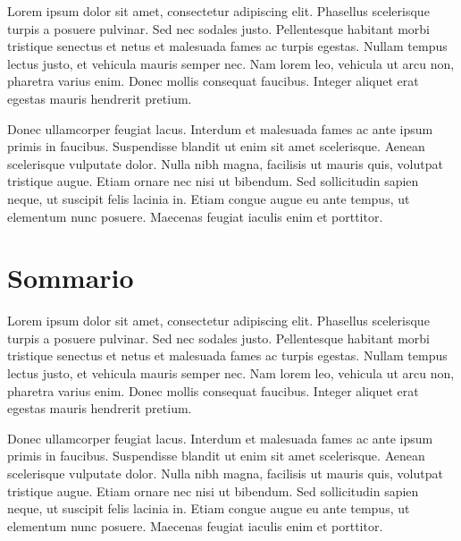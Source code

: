 Lorem ipsum dolor sit amet, consectetur adipiscing elit. Phasellus scelerisque turpis a posuere pulvinar. Sed nec sodales justo. Pellentesque habitant morbi tristique senectus et netus et malesuada fames ac turpis egestas. Nullam tempus lectus justo, et vehicula mauris semper nec. Nam lorem leo, vehicula ut arcu non, pharetra varius enim. Donec mollis consequat faucibus. Integer aliquet erat egestas mauris hendrerit pretium.

Donec ullamcorper feugiat lacus. Interdum et malesuada fames ac ante ipsum primis in faucibus. Suspendisse blandit ut enim sit amet scelerisque. Aenean scelerisque vulputate dolor. Nulla nibh magna, facilisis ut mauris quis, volutpat tristique augue. Etiam ornare nec nisi ut bibendum. Sed sollicitudin sapien neque, ut suscipit felis lacinia in. Etiam congue augue eu ante tempus, ut elementum nunc posuere. Maecenas feugiat iaculis enim et porttitor.

\chapter*{Sommario}

Lorem ipsum dolor sit amet, consectetur adipiscing elit. Phasellus scelerisque turpis a posuere pulvinar. Sed nec sodales justo. Pellentesque habitant morbi tristique senectus et netus et malesuada fames ac turpis egestas. Nullam tempus lectus justo, et vehicula mauris semper nec. Nam lorem leo, vehicula ut arcu non, pharetra varius enim. Donec mollis consequat faucibus. Integer aliquet erat egestas mauris hendrerit pretium.

Donec ullamcorper feugiat lacus. Interdum et malesuada fames ac ante ipsum primis in faucibus. Suspendisse blandit ut enim sit amet scelerisque. Aenean scelerisque vulputate dolor. Nulla nibh magna, facilisis ut mauris quis, volutpat tristique augue. Etiam ornare nec nisi ut bibendum. Sed sollicitudin sapien neque, ut suscipit felis lacinia in. Etiam congue augue eu ante tempus, ut elementum nunc posuere. Maecenas feugiat iaculis enim et porttitor.

